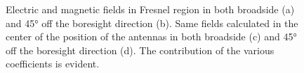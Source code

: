 \documentclass[10 pt,a4paper,twocolumn]{article}
\begin{document}
{\begin{figure}[bt!]
	\centering
	\begin{subfigure}{0.38\linewidth}
		\def\svgwidth{\linewidth}
		\tiny{}
		\caption{}
	\end{subfigure}	\hspace{0.15\linewidth}
	\begin{subfigure}{0.38\linewidth}
		\def\svgwidth{\linewidth}
		\tiny{}
		\caption{}
	\end{subfigure}	
	\begin{subfigure}{0.4\linewidth}
		\def\svgwidth{\linewidth}
		\tiny{}
		\caption{}
	\end{subfigure}
	\begin{subfigure}[b]{0.13\linewidth}
		\def\svgwidth{\linewidth}
		\tiny{}
	\end{subfigure}	
	\begin{subfigure}{0.4\linewidth}
		\def\svgwidth{\linewidth}
		\tiny{}
		\caption{}
	\end{subfigure}
	\caption{Electric and magnetic fields in Fresnel region in both broadside (a) and 45° off the boresight direction (b). Same fields calculated in the center of the position of the antennas in both broadside (c) and 45° off the boresight direction (d). The contribution of the various coefficients is evident.}
	\label{fig:EH field}
\end{figure}


}
\end{document}
